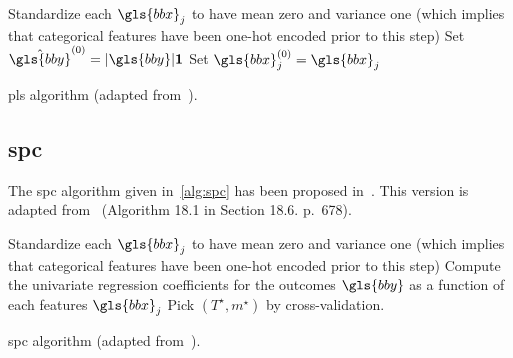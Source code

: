 \begin{algorithm}[H]
Standardize each $\gls{bbx}_j$ to have mean zero and variance one (which implies that categorical features have been one-hot encoded prior to this step) \;
Set $\hat{\gls{bby}}^{(0)} = |\gls{bby}| \mathbf{1}$\;
Set $\gls{bbx}_j^{(0)} = \gls{bbx}_j$\;
 \caption{\label{alg:pls} \gls{pls} algorithm (adapted from~\cite{friedman2001elements}).}
\end{algorithm}


\subsection{\gls{spc}} \label{app1:sec_spc}

The \gls{spc} algorithm given in~\eqref{alg:spc} has been proposed in~\cite{bair2006prediction}. This version is adapted from~\cite{friedman2001elements} (Algorithm 18.1 in Section 18.6. p.\ 678).

\begin{algorithm}[H]
Standardize each $\gls{bbx}_j$ to have mean zero and variance one (which implies that categorical features have been one-hot encoded prior to this step) \;
Compute the univariate regression coefficients for the outcomes $\gls{bby}$ as a function of each features $\gls{bbx}_j$\;
Pick $(T^\star, m^\star)$ by cross-validation.
 \caption{\label{alg:spc} \gls{spc} algorithm (adapted from~\cite{friedman2001elements}).}
\end{algorithm}

